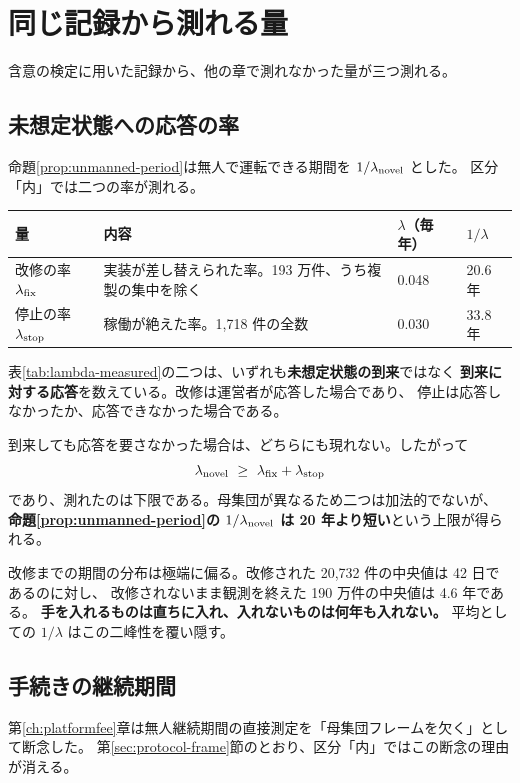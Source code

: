 \section{同じ記録から測れる量}
\label{sec:protocol-byproducts}

含意の検定に用いた記録から、他の章で測れなかった量が三つ測れる。

\subsection{未想定状態への応答の率}
命題\ref{prop:unmanned-period}は無人で運転できる期間を $1/\lambda_{\rm novel}$ とした。
区分「内」では二つの率が測れる。

\begin{center}
\begin{tabularx}{\textwidth}{@{}lXll@{}}
\toprule
量 & 内容 & $\lambda$（毎年） & $1/\lambda$ \\
\midrule
改修の率 $\lambda_{\rm fix}$ & 実装が差し替えられた率。193 万件、うち複製の集中を除く & 0.048 & 20.6 年 \\
停止の率 $\lambda_{\rm stop}$ & 稼働が絶えた率。1,718 件の全数 & 0.030 & 33.8 年 \\
\bottomrule
\end{tabularx}
\label{tab:lambda-measured}
\end{center}

\begin{remark}
\label{rem:lambda-is-response}
表\ref{tab:lambda-measured}の二つは、いずれも\textbf{未想定状態の到来}ではなく
\textbf{到来に対する応答}を数えている。改修は運営者が応答した場合であり、
停止は応答しなかったか、応答できなかった場合である。

到来しても応答を要さなかった場合は、どちらにも現れない。したがって
\[
\lambda_{\rm novel}\ \geq\ \lambda_{\rm fix}+\lambda_{\rm stop}
\]
であり、測れたのは下限である。母集団が異なるため二つは加法的でないが、
\textbf{命題\ref{prop:unmanned-period}の $1/\lambda_{\rm novel}$ は 20 年より短い}という上限が得られる。

改修までの期間の分布は極端に偏る。改修された 20,732 件の中央値は 42 日であるのに対し、
改修されないまま観測を終えた 190 万件の中央値は 4.6 年である。
\textbf{手を入れるものは直ちに入れ、入れないものは何年も入れない。}
平均としての $1/\lambda$ はこの二峰性を覆い隠す。
\end{remark}

\subsection{手続きの継続期間}
第\ref{ch:platformfee}章は無人継続期間の直接測定を「母集団フレームを欠く」として断念した。
第\ref{sec:protocol-frame}節のとおり、区分「内」ではこの断念の理由が消える。


